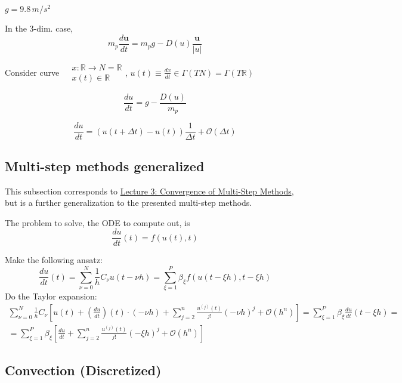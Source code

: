 \documentclass[10pt]{amsart}
\begin{document}
\begin{multicols*}{2}
$g=9.8 \, m/s^2$

In the 3-dim. case,
\[
m_p \frac{d\mathbf{u}}{dt} = m_p g - D(u) \frac{\mathbf{u}}{ |u| }
\]

Consider curve $\begin{aligned} & x: \mathbb{R} \to N = \mathbb{R} \\
  & x(t) \in \mathbb{R} \end{aligned}$,  $u(t) \equiv \frac{dx}{dt} \in \Gamma(TN) = \Gamma(T\mathbb{R})$

\[
\frac{du}{dt} = g - \frac{D(u)}{m_p}
\]

\[
\frac{du}{dt} = (u(t+\Delta t) - u(t)) \frac{1}{\Delta t} + \mathcal{O}(\Delta t)
\]



\subsection{Multi-step methods generalized}

This subsection corresponds to \href{http://ocw.mit.edu/courses/aeronautics-and-astronautics/16-901-computational-methods-in-aerospace-engineering-spring-2005/lecture-notes/lect3.pdf}{Lecture 3: Convergence of Multi-Step Methods}, but is a further generalization to the presented multi-step methods.

The problem to solve, the ODE to compute out, is
\begin{equation}
\frac{du}{dt}(t) = f(u(t),t)
\end{equation}

Make the following ansatz:
\begin{equation}
  \frac{du}{dt}(t) = \sum_{\nu = 0 }^N \frac{1}{h} C_{\nu} u(t-\nu h) = \sum_{\xi = 1}^P \beta_{\xi} f(u(t-\xi h) , t-\xi h)
\end{equation}
Do the Taylor expansion:  
\[
\begin{gathered}
  \sum_{\nu =0}^N \frac{1}{h} C_{\nu} \left[ u(t) + \left( \frac{du}{dt} \right)(t) \cdot (-\nu h) + \sum_{j=2}^n \frac{u^{(j)}(t) }{j!} (-\nu h)^j + \mathcal{O}(h^n) \right] = \sum_{\xi = 1}^P \beta_{\xi} \frac{du}{dt}(t-\xi h) = \\
  = \sum_{\xi =1}^P \beta_{\xi} \left[ \frac{du}{dt} + \sum_{j=2}^n \frac{u^{(j)}(t) }{j!} (-\xi h)^j + \mathcal{O}(h^n) \right]
  \end{gathered}
\]


\subsection{Convection (Discretized)}


\end{multicols*}
\end{document}
